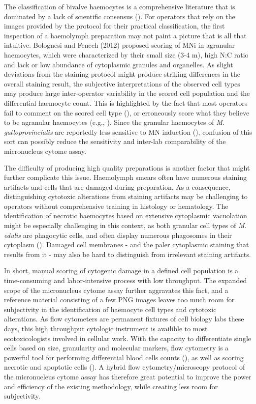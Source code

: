 The classification of bivalve haemocytes is a comprehensive literature that is dominated by a lack of scientific consensus (\cite{Hine1999}). For operators that rely on the images provided by the protocol for their practical classification, the first inspection of a haemolymph preparation may not paint a picture that is all that intuitive. Bolognesi and Fenech (2012) proposed scoring of MNi in agranular haemocytes, which were characterized by their small size (3-4 \micro m), high N:C ratio and lack or low abundance of cytoplasmic granules and organelles. As slight deviations from the staining protocol might produce striking differences in the overall staining result, the subjective interpretations of the observed cell types may produce large inter-operator variability in the scored cell population and the differential haemocyte count. This is highlighted by the fact that most operators fail to comment on the scored cell type (\cite{Bolognesi2012}), or erroneously score what they believe to be agranular haemocytes (e.g., \cite{Meng2020}). Since the granular haemocytes of \emph{M. galloprovincialis} are reportedly less sensitive to MN induction (\cite{Venier1997}), confusion of this sort can possibly reduce the sensitivity and inter-lab comparability of the micronucleus cytome assay. 

The difficulty of producing high quality preparations is another factor that might further complicate this issue. Haemolymph smears often have numerous staining artifacts and cells that are damaged during preparation. As a consequence, distinguishing cytotoxic alterations from staining artifacts may be challenging to operators without comprehensive training in histology or hematology. The identification of necrotic haemocytes based on extensive cytoplasmic vacuolation might be especially challenging in this context, as
both granular cell types of \emph{M. edulis} are phagocytic cells, and often display numerous phagosomes in their cytoplasm (\cite{Moore1977}). Damaged cell membranes - and the paler cytoplasmic staining that results from it - may also be hard to distinguish from irrelevant staining artifacts. 

In short, manual scoring of cytogenic damage in a defined cell population is a time-consuming and labor-intensive process with low throughput. The expanded scope of the micronucleus cytome assay further aggravates this fact, and a reference material consisting of a few PNG images leaves too much room for subjectivity in the identification of haemocyte cell types and cytotoxic alterations. As flow cytometers are permanent fixtures of cell biology labs these days, this high throughput cytologic instrument is availible to most ecotoxicologists involved in cellular work. With the capacity to differentiate single cells based on size, granularity and molecular markers, flow cytometry is a powerful tool for performing differential blood cells counts (\cite{Shapiro2004}), as well as scoring necrotic and apoptotic cells (\cite{Shapiro2003}). A hybrid flow cytometry/microscopy protocol of the micronucleus cytome assay has therefore great potential to improve the power and efficiency of the existing methodology, while creating less room for subjectivity.

